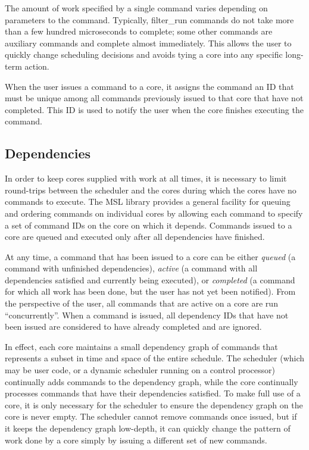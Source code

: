 The amount of work specified by a single command varies depending on
parameters to the command. Typically, \textsf{filter\_run} commands do
not take more than a few hundred microseconds to complete; some other
commands are auxiliary commands and complete almost immediately. This
allows the user to quickly change scheduling decisions and avoids
tying a core into any specific long-term action.

When the user issues a command to a core, it assigns the command an ID
that must be unique among all commands previously issued to that core
that have not completed. This ID is used to notify the user when the
core finishes executing the command.

\subsection{Dependencies}

In order to keep cores supplied with work at all times, it is
necessary to limit round-trips between the scheduler and the cores
during which the cores have no commands to execute. The MSL library
provides a general facility for queuing and ordering commands on
individual cores by allowing each command to specify a set of command
IDs on the core on which it depends. Commands issued to a core are
queued and executed only after all dependencies have finished.

At any time, a command that has been issued to a core can be either
\emph{queued} (a command with unfinished dependencies), \emph{active}
(a command with all dependencies satisfied and currently being
executed), or \emph{completed} (a command for which all work has been
done, but the user has not yet been notified). From the perspective of
the user, all commands that are active on a core are run
``concurrently''. When a command is issued, all dependency IDs that
have not been issued are considered to have already completed and are
ignored.

In effect, each core maintains a small dependency graph of commands
that represents a subset in time and space of the entire
schedule. The scheduler (which may be
user code, or a dynamic scheduler running on a control processor)
continually adds commands to the dependency graph, while the core
continually processes commands that have their dependencies
satisfied. To make full use of a core, it is only necessary for the
scheduler to ensure the dependency graph on the core is never
empty. The scheduler cannot remove commands once issued, but if it
keeps the dependency graph low-depth, it can quickly change the
pattern of work done by a core simply by issuing a different set of
new commands.

